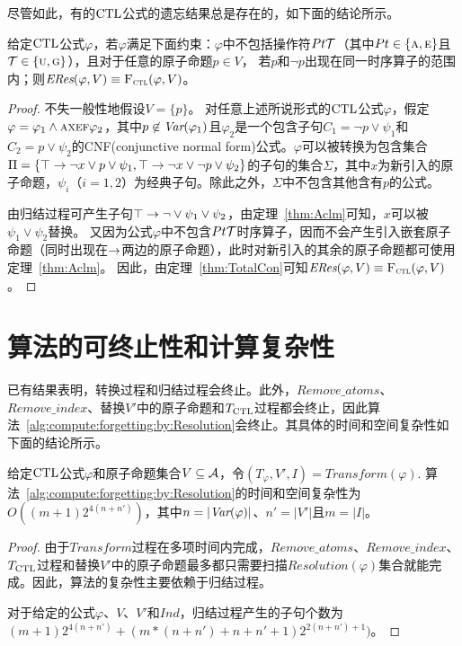 尽管如此，有的$\textrm{CTL}$公式的遗忘结果总是存在的，如下面的结论所示。
\begin{proposition} \label{pro:fogCTL}
给定$\textrm{CTL}$公式$\varphi$，若$\varphi$满足下面约束：$\varphi$中不包括操作符$Pt {\cal T}$（其中$Pt \in \{\textsc{a}, \textsc{e}\}$且${\cal T} \in \{\textsc{u}, \textsc{g}\}$），且对于任意的原子命题$p\in V$， 若$p$和$\neg p$出现在同一时序算子的范围内；则$\emph{ERes}(\varphi,V) \equiv {\textsc{F}_{\textsc{ctl}}}(\varphi, V)$。
\end{proposition}
\begin{proof}
	不失一般性地假设$V = \{p\}$。
	对任意上述所说形式的$\textrm{CTL}$公式$\varphi$，假定$\varphi = \varphi_1 \wedge \textsc{a} \textsc{x} \textsc{e} \textsc{f} \varphi_2$，其中$p\not \in \textit{Var}(\varphi_1)$且$\varphi_2$是一个包含子句$C_1 = \neg p \vee \psi_1$和$C_2 = p \vee \psi_2$的CNF(conjunctive normal form)公式。$\varphi$可以被转换为包含集合$\Pi = \{\top \rightarrow \neg x \vee p \vee  \psi_1,  \top \rightarrow \neg x \vee \neg p \vee \psi_2\}$的子句的集合$\Sigma$，其中$x$为新引入的原子命题，$\psi_i$（$i=1,2$）为经典子句。除此之外，$\Sigma$中不包含其他含有$p$的公式。
	
	由归结过程可产生子句$\top \rightarrow \neg \vee \psi_1 \vee \psi_2$，由定理~\ref{thm:Aclm}可知，$x$可以被$\psi_1 \vee \psi_2$替换。
	又因为公式$\varphi$中不包含$Pt {\cal T}$时序算子，因而不会产生引入嵌套原子命题（同时出现在$\rightarrow$两边的原子命题），此时对新引入的其余的原子命题都可使用定理~\ref{thm:Aclm}。
	因此，由定理~\ref{thm:TotalCon}可知$\emph{ERes}(\varphi,V) \equiv {\textsc{F}_{\textsc{ctl}}}(\varphi, V)$。
\end{proof}



\section{算法的可终止性和计算复杂性}
\label{chp4:sect:complex}
已有结果表明，转换过程和归结过程会终止\cite{zhang2014resolution}。此外，$Remove\_atoms$、$Remove\_index$、替换$V'$中的原子命题和$T_{\textrm{CTL}}$过程都会终止，因此算法~\ref{alg:compute:forgetting:by:Resolution}会终止。其具体的时间和空间复杂性如下面的结论所示。


\begin{proposition}\label{pro:complexity}
	给定$\textrm{CTL}$公式$\varphi$和原子命题集合$V \subseteq {\cal A}$，令$(T_{\varphi}, V', I)=Transform(\varphi)$.
	算法~\ref{alg:compute:forgetting:by:Resolution}的时间和空间复杂性为$O((m+1)2^{4(n+n')})$，其中$n=|\textit{Var}(\varphi)|$、$n'=|V'|$且$m=|I|$。
\end{proposition}
\begin{proof}
	由于$Transform$过程在多项时间内完成，$Remove\_atoms$、$Remove\_index$、$T_{\textrm{CTL}}$过程和替换$V'$中的原子命题最多都只需要扫描$Resolution(\varphi)$集合就能完成。因此，算法的复杂性主要依赖于归结过程。
	
	对于给定的公式$\varphi$、$V$、$V'$和$Ind$，归结过程产生的子句个数为$(m+1)2^{4(n+n')}+(m*(n+n')+n+n'+1)2^{2(n+n')+1})$。
\end{proof}

